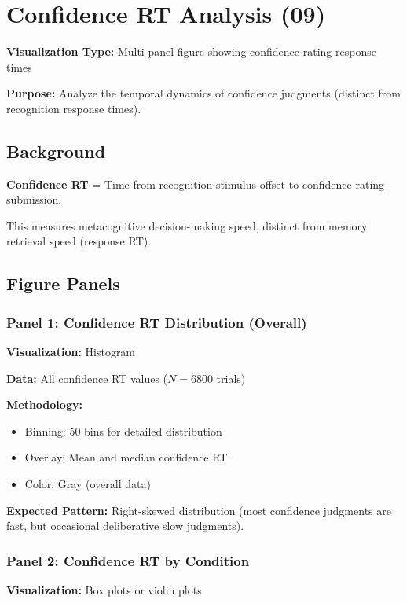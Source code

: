 \documentclass[12pt,a4paper]{article}
\begin{document}
\newpage
\section{Confidence RT Analysis (09)}

\textbf{Visualization Type:} Multi-panel figure showing confidence rating response times

\textbf{Purpose:} Analyze the temporal dynamics of confidence judgments (distinct from recognition response times).

\subsection{Background}

\textbf{Confidence RT} = Time from recognition stimulus offset to confidence rating submission.

This measures metacognitive decision-making speed, distinct from memory retrieval speed (response RT).

\subsection{Figure Panels}

\subsubsection{Panel 1: Confidence RT Distribution (Overall)}

\textbf{Visualization:} Histogram

\textbf{Data:} All confidence RT values ($N=6800$ trials)

\textbf{Methodology:}
\begin{itemize}
    \item Binning: 50 bins for detailed distribution
    \item Overlay: Mean and median confidence RT
    \item Color: Gray (overall data)
\end{itemize}

\textbf{Expected Pattern:} Right-skewed distribution (most confidence judgments are fast, but occasional deliberative slow judgments).

\subsubsection{Panel 2: Confidence RT by Condition}

\textbf{Visualization:} Box plots or violin plots
\end{document}
